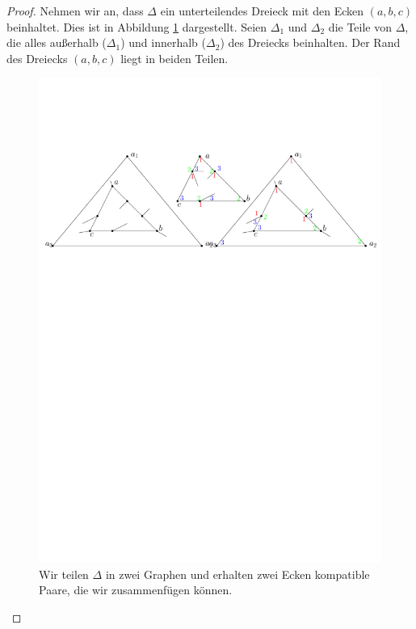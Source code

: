 \begin{proof}
Nehmen wir an, dass $\Delta$ ein unterteilendes Dreieck mit den Ecken $(a,b,c)$ beinhaltet. Dies ist in Abbildung \ref{lem2} dargestellt. Seien $\Delta_1$ und $\Delta_2$ die Teile von $\Delta$, die alles außerhalb ($\Delta_1$) und innerhalb ($\Delta_2$) des Dreiecks beinhalten. Der Rand des Dreiecks $(a,b,c)$ liegt in beiden Teilen.

\begin{figure}
\centering
\includegraphics[width=1\textwidth]{lem2.pdf}
\caption{Wir teilen $\Delta$ in zwei Graphen und erhalten zwei Ecken kompatible Paare, die wir zusammenfügen können.}
\label{lem2}
\centering
\end{figure}


\end{proof}

